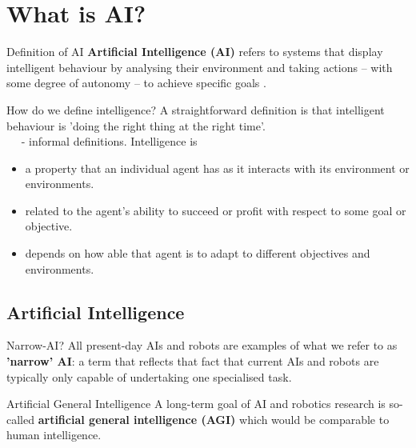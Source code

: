 \documentclass{beamer}
\begin{document}





\section{What is AI?}
\begin{frame}{Definition of AI}
\textbf{Artificial Intelligence (AI)} refers to systems that display intelligent behaviour by analysing their environment and taking actions – with some degree of autonomy – to achieve specific goals \citep{ec2011communication}.
\end{frame}

\begin{frame}{How do we define intelligence?}
A straightforward definition is that intelligent behaviour is 'doing the right thing at the right time'.
\\~\
\cite{legg2007collection} - informal definitions. Intelligence is
\begin{itemize}
\item a property that an individual agent has as it interacts with its environment or environments. 
\item related to the agent's ability to succeed or profit with respect to some goal or objective.
\item depends on how able that agent is to adapt to different objectives and environments.
\end{itemize}
\end{frame}

\subsection{Artificial Intelligence}
\begin{frame}{Narrow-AI?}
All present-day AIs and robots are examples of what we refer to as \textbf{'narrow' AI}: a term that reflects that fact that current AIs and robots are typically only capable of undertaking one specialised task.
\end{frame}


\begin{frame}{Artificial General Intelligence}
A long-term goal of AI and robotics research is so-called \textbf{artificial general intelligence (AGI)} which would be comparable to human intelligence.
\end{frame}
\end{document}
